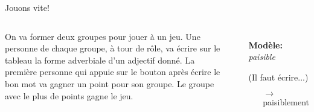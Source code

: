 \begin{frame}{Jouons vite!}
  \begin{columns}
      On va former deux groupes pour jouer à un jeu.
      Une personne de chaque groupe, à tour de rôle, va écrire sur le tableau la forme adverbiale d'un adjectif donné.
      La première personne qui appuie sur le bouton après écrire le bon mot va gagner un point pour son groupe.
      Le groupe avec le plus de points gagne le jeu.
      \begin{itemize}
        \item[] \textbf{Modèle:} \emph{paisible}
        \item[] (Il faut écrire...)
        \begin{itemize}
          \item[$\to$] paisiblement
        \end{itemize}
      \end{itemize}
  \end{columns}
\end{frame}